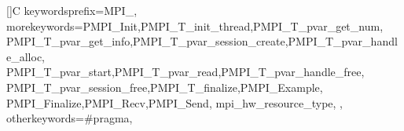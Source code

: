 \newcommand{\toolchangebeg}[1]{\cbstart{\color{green}#1}\xspace}
\newcommand{\toolchangeend}{\cbend}

\newcommand{\chgfeba}[1]{\toolchangebeg{#1}\toolchangeend}
\newcommand{\chgfebb}[1]{\toolchangebeg{#1}\toolchangeend}

\renewcommand{\textfraction}{0.07}
\renewcommand{\floatpagefraction}{0.9}
\setcounter{topnumber}{10}
\setcounter{bottomnumber}{10}
\setcounter{totalnumber}{20} 
   
\def\eg{e.g.}

\usepackage{listings}



[]{C}%
{%
        keywordsprefix={MPI_},%
        morekeywords={PMPI_Init,PMPI_T_init_thread,PMPI_T_pvar_get_num,%
PMPI_T_pvar_get_info,PMPI_T_pvar_session_create,PMPI_T_pvar_handle_alloc,%
PMPI_T_pvar_start,PMPI_T_pvar_read,PMPI_T_pvar_handle_free,%
PMPI_T_pvar_session_free,PMPI_T_finalize,PMPI_Example,%
PMPI_Finalize,PMPI_Recv,PMPI_Send,%
mpi_hw_resource_type,
},%
        otherkeywords={\#pragma},
}

